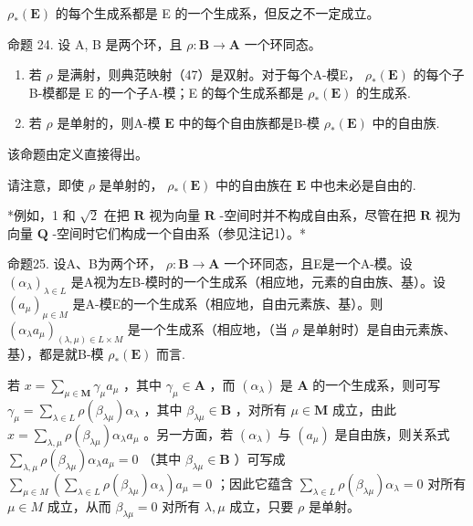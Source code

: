 \(\rho_{*}(\mathbf{E})\) 的每个生成系都是 E 的一个生成系，但反之不一定成立。

命题 24. 设 A, B 是两个环，且 \(\rho: \mathbf{B} \to \mathbf{A}\) 一个环同态。

\begin{enumerate}
\def\labelenumi{(\roman{enumi})}
\item
  若 \(\rho\) 是满射，则典范映射（47）是双射。对于每个A-模E， \(\rho_{*}(\mathbf{E})\) 的每个子B-模都是 E 的一个子A-模；E 的每个生成系都是 \(\rho_{*}(\mathbf{E})\) 的生成系.
\item
  若 \(\rho\) 是单射的，则A-模 \(\mathbf{E}\) 中的每个自由族都是B-模 \(\rho_{*}(\mathbf{E})\) 中的自由族.
\end{enumerate}

该命题由定义直接得出。

请注意，即使 \(\rho\) 是单射的， \(\rho_{*}(\mathbf{E})\) 中的自由族在 \(\mathbf{E}\) 中也未必是自由的.

*例如，1 和 \(\sqrt{2}\) 在把 \(\mathbf{R}\) 视为向量 \(\mathbf{R}\) -空间时并不构成自由系，尽管在把 \(\mathbf{R}\) 视为向量 \(\mathbf{Q}\) -空间时它们构成一个自由系（参见注记1）。*

命题25. 设A、B为两个环， \(\rho: \mathbf{B} \to \mathbf{A}\) 一个环同态，且E是一个A-模。设 \((\alpha_{\lambda})_{\lambda \in L}\) 是A视为左B-模时的一个生成系（相应地，元素的自由族、基）。设 \((a_{\mu})_{\mu \in M}\) 是A-模E的一个生成系（相应地，自由元素族、基）。则 \((\alpha_{\lambda}a_{\mu})_{(\lambda,\mu) \in L \times M}\) 是一个生成系（相应地，（当 \(\rho\) 是单射时）是自由元素族、基），都是就B-模 \(\rho_{*}(\mathbf{E})\) 而言.

若 \(x = \sum_{\mu \in \mathbf{M}} \gamma_{\mu} a_{\mu}\) ，其中 \(\gamma_{\mu} \in \mathbf{A}\) ，而 \((\alpha_{\lambda})\) 是 \(\mathbf{A}\) 的一个生成系，则可写 \(\gamma_{\mu} = \sum_{\lambda \in L} \rho(\beta_{\lambda \mu}) \alpha_{\lambda}\) ，其中 \(\beta_{\lambda \mu} \in \mathbf{B}\) ，对所有 \(\mu \in \mathbf{M}\) 成立，由此 \(x = \sum_{\lambda, \mu} \rho(\beta_{\lambda \mu}) \alpha_{\lambda} a_{\mu}\) 。另一方面，若 \((\alpha_{\lambda})\) 与 \((a_{\mu})\) 是自由族，则关系式 \(\sum_{\lambda, \mu} \rho(\beta_{\lambda \mu}) \alpha_{\lambda} a_{\mu} = 0\) （其中 \(\beta_{\lambda \mu} \in \mathbf{B}\) ）可写成 \(\sum_{\mu \in M} \left( \sum_{\lambda \in L} \rho(\beta_{\lambda \mu}) \alpha_{\lambda} \right) a_{\mu} = 0\) ；因此它蕴含 \(\sum_{\lambda \in L} \rho(\beta_{\lambda \mu}) \alpha_{\lambda} = 0\) 对所有 \(\mu \in M\) 成立，从而 \(\beta_{\lambda \mu} = 0\) 对所有 \(\lambda, \mu\) 成立，只要 \(\rho\) 是单射。

